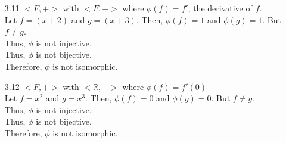 \documentclass[12pt]{article}
\newcommand{\R}{\mathbb{R}}
\begin{document}
\begin{enumerate}
		\begin{enumerate}
			
			\item[3.11] $<F,+>$ with $<F,+>$ where $\phi(f) = f'$, the derivative of $f$.\\
				Let $ f=(x+2) $ and $ g=(x+3) $. Then, $ \phi(f) = 1 $ and $ \phi(g) = 1 $. But $ f \not = g $. \\
				Thus, $ \phi $ is not injective. \\
				Thus, $ \phi $ is not bijective. \\
				Therefore, $ \phi $ is not isomorphic.
				
			\item[3.12] $<F,+>$ with $<\R,+>$ where $\phi(f) = f'(0)$\\
				Let $ f=x^2 $ and $ g=x^3 $. Then, $ \phi(f) = 0 $ and $ \phi(g) = 0 $. But $ f \not = g $. \\
				Thus, $ \phi $ is not injective. \\
				Thus, $ \phi $ is not bijective. \\
				Therefore, $ \phi $ is not isomorphic.
				

\end{enumerate}
\end{enumerate}
\end{document}
